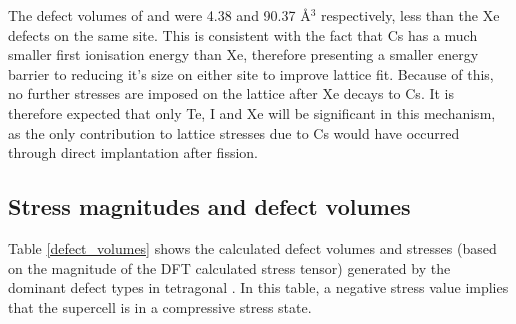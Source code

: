 The defect volumes of  and  were 4.38 and 90.37 \r{A}$^{3}$ respectively, less than the Xe defects on the same site. This is consistent with the fact that Cs has a much smaller first ionisation energy than Xe, therefore presenting a smaller energy barrier to reducing it's size on either site to improve lattice fit. Because of this, no further stresses are imposed on the lattice after Xe decays to Cs. It is therefore expected that only Te, I and Xe will be significant in this mechanism, as the only contribution to lattice stresses due to Cs would have occurred through direct implantation after fission. 




\subsection{Stress magnitudes and defect volumes}

Table \ref{defect_volumes} shows the calculated defect volumes and stresses (based on the magnitude of the DFT calculated stress tensor) generated by the dominant defect types in tetragonal \zirconia . In this table, a negative stress value implies that the supercell is in a compressive stress state.

